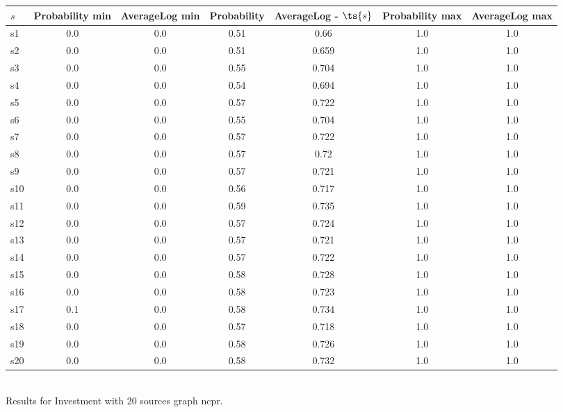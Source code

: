 \documentclass{article}
\begin{document}
\noindent\begin{tabular}{|l|c|c|c|c|c|c|}
\hline
$s$& Probability min & AverageLog min & Probability & AverageLog - $\ts{s}$ & Probability max & AverageLog max\\
\hline
s1 &0.0 & 0.0 & 0.51 & 0.66 & 1.0 & 1.0\\
\hline
s2 &0.0 & 0.0 & 0.51 & 0.659 & 1.0 & 1.0\\
\hline
s3 &0.0 & 0.0 & 0.55 & 0.704 & 1.0 & 1.0\\
\hline
s4 &0.0 & 0.0 & 0.54 & 0.694 & 1.0 & 1.0\\
\hline
s5 &0.0 & 0.0 & 0.57 & 0.722 & 1.0 & 1.0\\
\hline
s6 &0.0 & 0.0 & 0.55 & 0.704 & 1.0 & 1.0\\
\hline
s7 &0.0 & 0.0 & 0.57 & 0.722 & 1.0 & 1.0\\
\hline
s8 &0.0 & 0.0 & 0.57 & 0.72 & 1.0 & 1.0\\
\hline
s9 &0.0 & 0.0 & 0.57 & 0.721 & 1.0 & 1.0\\
\hline
s10 &0.0 & 0.0 & 0.56 & 0.717 & 1.0 & 1.0\\
\hline
s11 &0.0 & 0.0 & 0.59 & 0.735 & 1.0 & 1.0\\
\hline
s12 &0.0 & 0.0 & 0.57 & 0.724 & 1.0 & 1.0\\
\hline
s13 &0.0 & 0.0 & 0.57 & 0.721 & 1.0 & 1.0\\
\hline
s14 &0.0 & 0.0 & 0.57 & 0.722 & 1.0 & 1.0\\
\hline
s15 &0.0 & 0.0 & 0.58 & 0.728 & 1.0 & 1.0\\
\hline
s16 &0.0 & 0.0 & 0.58 & 0.723 & 1.0 & 1.0\\
\hline
s17 &0.1 & 0.0 & 0.58 & 0.734 & 1.0 & 1.0\\
\hline
s18 &0.0 & 0.0 & 0.57 & 0.718 & 1.0 & 1.0\\
\hline
s19 &0.0 & 0.0 & 0.58 & 0.726 & 1.0 & 1.0\\
\hline
s20 &0.0 & 0.0 & 0.58 & 0.732 & 1.0 & 1.0\\
\hline
\end{tabular}\\

\noindent Results for Investment with 20 sources graph ncpr.
\end{document}

